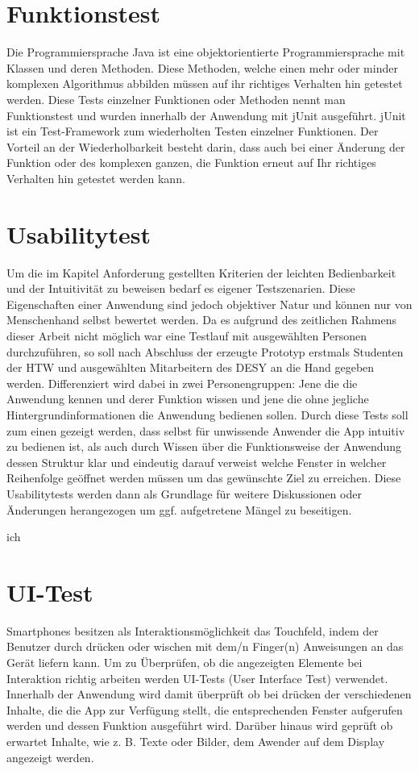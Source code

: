 \documentclass[10pt, a4paper]{scrreprt}
\begin{document}
\section{Funktionstest}
Die Programmiersprache Java ist eine objektorientierte Programmiersprache mit Klassen und deren Methoden. Diese Methoden, welche einen mehr oder minder komplexen Algorithmus abbilden müssen auf ihr richtiges Verhalten hin getestet werden. Diese Tests einzelner Funktionen oder Methoden nennt man Funktionstest und wurden innerhalb der Anwendung mit jUnit ausgeführt. jUnit ist ein Test-Framework zum wiederholten Testen einzelner Funktionen. Der Vorteil an der Wiederholbarkeit besteht darin, dass auch bei einer Änderung der Funktion oder des komplexen ganzen, die Funktion erneut auf Ihr richtiges Verhalten hin getestet werden kann.   


\section{Usabilitytest}
Um die im Kapitel Anforderung gestellten Kriterien der leichten Bedienbarkeit und der Intuitivität zu beweisen bedarf es eigener Testszenarien. Diese Eigenschaften einer Anwendung sind jedoch objektiver Natur und können nur von Menschenhand selbst bewertet werden. Da es aufgrund des zeitlichen Rahmens dieser Arbeit nicht möglich war eine Testlauf mit ausgewählten Personen durchzuführen, so soll nach Abschluss der erzeugte Prototyp erstmals Studenten der HTW und ausgewählten Mitarbeitern des DESY an die Hand gegeben werden. Differenziert wird dabei in zwei Personengruppen: Jene die die Anwendung kennen und derer Funktion wissen und jene die ohne jegliche Hintergrundinformationen die Anwendung bedienen sollen. Durch diese Tests soll zum einen gezeigt werden, dass  selbst für unwissende Anwender die App intuitiv zu bedienen ist, als auch durch Wissen über die Funktionsweise der Anwendung dessen Struktur klar und eindeutig darauf verweist welche Fenster in welcher Reihenfolge geöffnet werden müssen um das gewünschte Ziel zu erreichen. Diese Usabilitytests werden dann als Grundlage für weitere Diskussionen oder Änderungen herangezogen um ggf. aufgetretene Mängel zu beseitigen.

ich
\section{UI-Test}
Smartphones besitzen als Interaktionsmöglichkeit das Touchfeld, indem der Benutzer durch drücken oder wischen mit dem/n Finger(n) Anweisungen an das Gerät liefern kann. Um zu Überprüfen, ob die angezeigten Elemente bei Interaktion richtig arbeiten werden UI-Tests (User Interface Test) verwendet. Innerhalb der Anwendung wird damit überprüft ob bei drücken der verschiedenen Inhalte, die die App zur Verfügung stellt, die entsprechenden Fenster aufgerufen werden und dessen Funktion ausgeführt wird. Darüber hinaus wird geprüft ob erwartet Inhalte, wie z. B. Texte oder Bilder, dem Awender auf dem Display angezeigt werden. 
\end{document}

